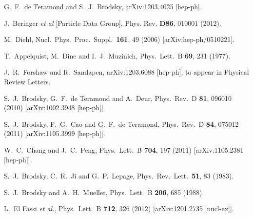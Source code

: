 \documentclass[prd,aps,onecolumn,nofootinbib]{revtex4}
\begin{document}
\begin{thebibliography}{99}
  G.~F.~de Teramond and S.~J.~Brodsky,
  arXiv:1203.4025 [hep-ph].

 J.~Beringer {\it et al} [Particle Data Group], 
 Phys. Rev. {\bf D86}, 010001 (2012).

  M.~Diehl,
  Nucl.\ Phys.\ Proc.\ Suppl.\  {\bf 161}, 49 (2006)
  [arXiv:hep-ph/0510221].

  T.~Appelquist, M.~Dine and I.~J.~Muzinich,
  Phys.\ Lett.\  B {\bf 69}, 231 (1977).
  
  J.~R.~Forshaw and R.~Sandapen,
  arXiv:1203.6088 [hep-ph], to appear in Physical Review Letters.

  S.~J.~Brodsky, G.~F.~de Teramond and A.~Deur,
  Phys.\ Rev.\  D {\bf 81}, 096010 (2010)
  [arXiv:1002.3948 [hep-ph]].

  S.~J.~Brodsky, F.~G.~Cao and G.~F.~de Teramond,
  Phys.\ Rev.\  D {\bf 84}, 075012 (2011)
  [arXiv:1105.3999 [hep-ph]].

  W.~C.~Chang and J.~C.~Peng,
  Phys.\ Lett.\  B {\bf 704}, 197 (2011)
  [arXiv:1105.2381 [hep-ph]].
  
  S.~J.~Brodsky, C.~R.~Ji and G.~P.~Lepage,
  Phys.\ Rev.\ Lett.\  {\bf 51}, 83 (1983).

  S.~J.~Brodsky and A.~H.~Mueller,
  Phys.\ Lett.\  B {\bf 206}, 685 (1988).

  L.~El Fassi {\it et al.},
  Phys.\ Lett.\  B {\bf 712}, 326 (2012)
  [arXiv:1201.2735 [nucl-ex]].
  

\end{thebibliography}
\end{document}
